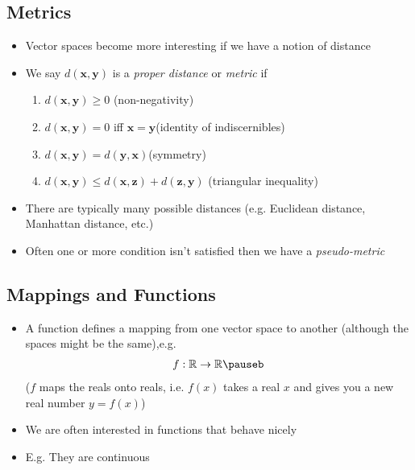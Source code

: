 \begin{slide}
\section[-1]{Metrics}

\begin{PauseHighLight}
  \begin{itemize}
  \item Vector spaces become more interesting if we have a notion of distance\pause
  \item We say $d(\bm{x}, \bm{y})$ is a \emph{proper distance} or \emph{metric} if
    \begin{enumerate}\squeeze
    \item $d(\bm{x}, \bm{y}) \geq 0$ \hfill (non-negativity)\pause
    \item $d(\bm{x}, \bm{y}) = 0$ iff $\bm{x} =\bm{y}$\hfill  (identity
      of indiscernibles)\pause
    \item $d(\bm{x}, \bm{y}) = d(\bm{y}, \bm{x})$\hfill (symmetry)\pause
    \item $d(\bm{x}, \bm{y}) \leq d(\bm{x}, \bm{z}) +d(\bm{z}, \bm{y})$
      \hfill(triangular inequality)\pause
    \end{enumerate}
  \item There are typically many possible distances (e.g. Euclidean
    distance, Manhattan distance, etc.)\pause
  \item Often one or more condition isn't satisfied then we have a
    \emph{pseudo-metric}\pause
  \end{itemize}
\end{PauseHighLight}

\end{slide}


\begin{slide}
\section{Mappings and Functions}

\begin{PauseHighLight}
  \begin{itemize}
  \item A function defines a mapping from one vector space to another
    (although the spaces might be the same),\pause e.g.
    \begin{align*}
      f: \mathbb{R} \rightarrow \mathbb{R}\pauseb
    \end{align*}
    ($f$ maps the reals onto reals, i.e. $f(x)$ takes a real $x$ and
    gives you a new real number $y=f(x)$)\pauseb
  \item We are often interested in functions that behave nicely\pauseb
  \item E.g. They are continuous\pauseb
  \end{itemize}
\end{PauseHighLight}

\end{slide}

